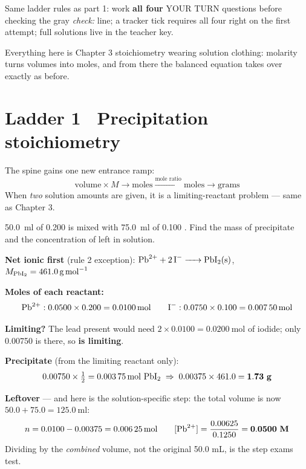 \documentclass{apchem-worksheet}
\begin{document}
\apctitleblock

\begin{apcnote}
Same ladder rules as part 1: work \textbf{all four} YOUR TURN questions
before checking the gray \emph{check:} line; a tracker tick requires all
four right on the first attempt; full solutions live in the teacher key.

Everything here is Chapter 3 stoichiometry wearing solution clothing:
molarity turns volumes into moles, and from there the balanced equation
takes over exactly as before.
\end{apcnote}

\section*{\sffamily Ladder 1 \textbullet\ Precipitation stoichiometry}

The spine gains one new entrance ramp:
\[ \text{volume} \times M \to \text{moles}
   \xrightarrow{\text{mole ratio}} \text{moles} \to \text{grams} \]
When \emph{two} solution amounts are given, it is a limiting-reactant
problem --- same as Chapter 3.

\begin{workedexample}
\SI{50.0}{\milli\litre} of \SI{0.200}{\Molar}  is mixed with
\SI{75.0}{\milli\litre} of \SI{0.100}{\Molar} . Find the mass of
precipitate and the concentration of  left in solution.

\textbf{Net ionic first} (rule 2 exception):
$\ce{Pb^2+ + 2I- -> PbI2(s)}$, $M_{\ce{PbI2}} = \SI{461.0}{\gram\per\mole}$

\textbf{Moles of each reactant:}
\[ \ce{Pb^2+}: 0.0500 \times 0.200 = \SI{0.0100}{\mole} \qquad
   \ce{I-}: 0.0750 \times 0.100 = \SI{0.00750}{\mole} \]

\textbf{Limiting?} The lead present would need $2 \times 0.0100 =
\SI{0.0200}{\mole}$ of iodide; only 0.00750 is there, so \textbf{
is limiting}.

\textbf{Precipitate} (from the limiting reactant only):
\[ 0.00750 \times \tfrac{1}{2} = \SI{0.00375}{\mole}~\ce{PbI2}
   \;\Rightarrow\; 0.00375 \times 461.0 = \mathbf{1.73~g} \]

\textbf{Leftover } --- and here is the solution-specific step:
the total volume is now $50.0 + 75.0 = \SI{125.0}{\milli\litre}$:
\[ n = 0.0100 - 0.00375 = \SI{0.00625}{\mole} \qquad
   [\ce{Pb^2+}] = \frac{0.00625}{0.1250} = \mathbf{0.0500~M} \]
Dividing by the \emph{combined} volume, not the original 50.0 mL, is the
step exams test.
\end{workedexample}
\end{document}
